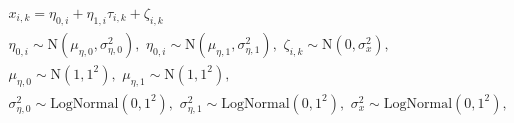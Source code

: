\begin{equation}
\begin{gathered}
  x_{i, k} = \eta_{0, i} + \eta_{1, i} \tau_{i, k} + \zeta_{i, k}  \\
  \eta_{0, i} \sim \text{N}(\mu_{\eta, 0}, \sigma^{2}_{\eta, 0}), \,\,
  \eta_{0, i} \sim \text{N}(\mu_{\eta, 1}, \sigma^{2}_{\eta, 1}), \,\,
  \zeta_{i, k} \sim \text{N}(0, \sigma^{2}_{x}), \\
  \mu_{\eta, 0} \sim \text{N}(1, 1^2), \,\,
  \mu_{\eta, 1} \sim \text{N}(1, 1^2), \\
  \sigma^{2}_{\eta, 0} \sim \text{LogNormal}(0, 1^2), \,\,
  \sigma^{2}_{\eta, 1} \sim \text{LogNormal}(0, 1^2), \,\,
  \sigma^{2}_{x} \sim \text{LogNormal}(0, 1^2),
\end{gathered}
\label{eqn:submodel-three-model}
\end{equation}